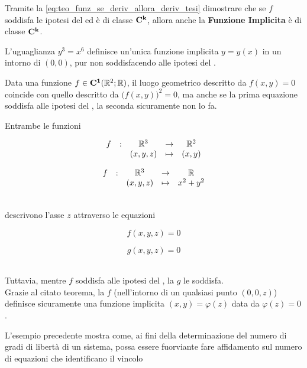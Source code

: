 \begin{exercise}
	\label{ex:funz_impl_diff_k}
	Tramite la \cref{eq:teo_funz_se_deriv_allora_deriv_tesi} dimostrare che se $f$ soddisfa le ipotesi del  ed è di classe $\mathbf{C^{k}}$, allora anche la \textbf{Funzione Implicita} è di classe $\mathbf{C^{k}}$.
\end{exercise}
\begin{example}
	L'uguaglianza $y^3 = x^6$ definisce un'unica funzione implicita $y = y(x)$ in un intorno di $(0,0)$, pur non soddisfacendo alle ipotesi del .
\end{example}
\begin{example}
	Data una funzione $f \in \mathbf{C^{1}}(\mathbb{R}^2;\mathbb{R})$, il luogo geometrico descritto da $f(x,y) = 0$ coincide con quello descritto da $\bigl( f(x,y) \bigr)^2 = 0$, ma anche se la prima equazione soddisfa alle ipotesi del , la seconda sicuramente non lo fa.
\end{example}
\begin{example}
	Entrambe le funzioni\\

	\begin{minipage}{0.49\linewidth}
		\[\begin{array}{ccccc} {f} & : & {\mathbb{R}^3} & \to & {\mathbb{R}^2} \\ & & {(x,y,z)} & \mapsto & {(x,y)} \\ \end{array}\]
	\end{minipage}
	\begin{minipage}{0.49\linewidth}
		\[\begin{array}{ccccc} {f} & : & {\mathbb{R}^3} & \to & {\mathbb{R}} \\ & & {(x,y,z)} & \mapsto & {x^2+y^2} \\ \end{array}\]
	\end{minipage}\\

	descrivono l'asse $z$ attraverso le equazioni\\

	\begin{minipage}{0.49\linewidth}
		\[f(x,y,z) = 0\]
	\end{minipage}
	\begin{minipage}{0.49\linewidth}
		\[g(x,y,z) = 0\]
	\end{minipage}\\

	Tuttavia, mentre $f$ soddisfa alle ipotesi del , la $g$ le soddisfa.\\
	Grazie al citato teorema, la $f$ (nell'intorno di un qualsiasi punto $(0,0,z)$) definisce sicuramente una funzione implicita $(x,y) = \varphi(z)$ data da $\varphi(z) = 0$.
	\begin{note}
		L'esempio precedente mostra come, ai fini della determinazione del numero di gradi di libertà di un sistema, possa essere fuorviante fare affidamento sul numero di equazioni che identificano il vincolo
	\end{note}
\end{example}
